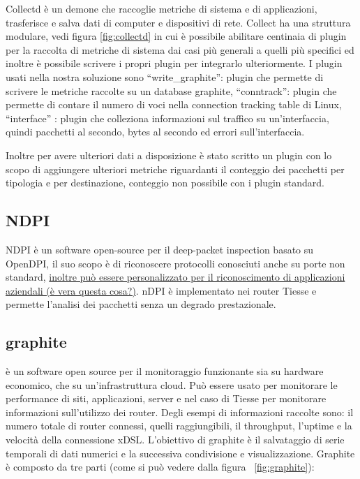 Collectd è un demone che raccoglie metriche di sistema e di applicazioni, trasferisce e salva dati di computer e dispositivi di rete. Collect ha una struttura modulare, vedi figura \ref{fig:collectd} in cui è possibile abilitare centinaia di plugin per la raccolta di metriche di sistema dai casi più generali a quelli più specifici ed inoltre è possibile scrivere i propri plugin per integrarlo ulteriormente. I plugin usati nella nostra soluzione sono ``write\_graphite'': plugin che permette di scrivere le metriche raccolte su un database graphite, ``conntrack'': plugin che permette di contare il numero di voci nella connection tracking table di Linux, ``interface'' : plugin che colleziona informazioni sul traffico su un'interfaccia, quindi pacchetti al secondo, bytes al secondo ed errori sull'interfaccia. 

Inoltre per avere ulteriori dati a disposizione è stato scritto un plugin con lo scopo di aggiungere ulteriori metriche riguardanti il conteggio dei pacchetti per tipologia e per destinazione, conteggio non possibile con i plugin standard.




\subsection{NDPI} 
NDPI è un software open-source per il deep-packet inspection basato su OpenDPI, il suo scopo è di riconoscere protocolli conosciuti anche su porte non standard, \uline{inoltre può essere personalizzato per il riconoscimento di applicazioni aziendali (è vera questa cosa?)}. nDPI è implementato nei router Tiesse e permette l'analisi dei pacchetti senza un degrado prestazionale.


\subsection{graphite} è un software open source per il monitoraggio funzionante sia su hardware economico, che su un'infrastruttura cloud. Può essere usato per monitorare le performance di siti, applicazioni, server e nel caso di Tiesse per monitorare informazioni sull'utilizzo dei router. Degli esempi di informazioni raccolte sono: il numero totale di router connessi, quelli raggiungibili, il throughput, l'uptime e la velocità della connessione xDSL.
L'obiettivo di graphite è il salvataggio di serie temporali di dati numerici e la successiva condivisione e visualizzazione.
Graphite è composto da tre parti (come si può vedere dalla figura ~\ref{fig:graphite}):

